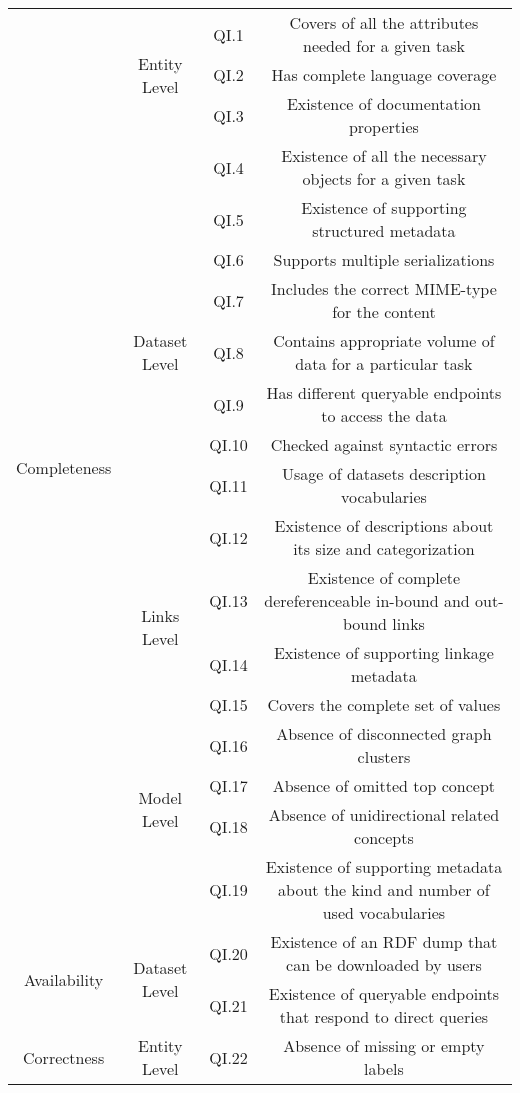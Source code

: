 \documentclass[onecolumn, crcready]{iosart2c}
\begin{document}
\begin{landscape}
\begin{center}
{\begin{longtable}[h]{|c|c|c|c|}
\multirow{19}{*}{Completeness} & \multirow{3}{*}{Entity Level} & QI.1 & Covers of all the attributes needed for a given task \cite{Mendes2012}\tabularnewline
\cline{3-4}
 &  & QI.2 & Has complete language coverage \cite{Mader2012}\tabularnewline
\cline{3-4}
 &  & QI.3 & Existence of documentation properties  \cite{w3c_skos_rec}\cite{Mader2012}\tabularnewline
\cline{2-4}
 & \multirow{9}{*}{Dataset Level} & QI.4 & Existence of all the necessary objects for a given task \cite{Mendes2012}\tabularnewline
\cline{3-4}
 &  & QI.5 & Existence of supporting structured metadata  \cite{Hogan2010}\tabularnewline
\cline{3-4}
 &  & QI.6 & Supports multiple serializations \cite{Framework2012}\tabularnewline
\cline{3-4}
 &  & QI.7 & Includes the correct MIME-type for the content  \cite{Hogan2010}\tabularnewline
\cline{3-4}
 &  & QI.8 & Contains appropriate volume of data for a particular task \cite{Framework2012}\tabularnewline
\cline{3-4}
 &  & QI.9 & Has different queryable endpoints to access the data \cite{Framework2012}\tabularnewline
\cline{3-4}
 &  & QI.10 & Checked against syntactic errors \cite{Hogan2010}\tabularnewline
\cline{3-4}
 &  & QI.11 & Usage of datasets description vocabularies \tabularnewline
\cline{3-4}
 &  & QI.12 & Existence of descriptions about its size and categorization \tabularnewline
\cline{2-4}
 & \multirow{2}{*}{Links Level} & QI.13 & Existence of complete dereferenceable in-bound and out-bound links \cite{Hogan2010}\cite{Mader2012}\cite{Gueret2012}\tabularnewline
\cline{3-4}
 &  & QI.14 & Existence of supporting linkage metadata  \cite{Hogan2010}\tabularnewline
\cline{2-4}
 & \multirow{5}{*}{Model Level} & QI.15 & Covers the complete set of values \cite{Mader2012}\tabularnewline
\cline{3-4}
 &  & QI.16 & Absence of disconnected graph clusters \cite{Mader2012}\tabularnewline
\cline{3-4}
 &  & QI.17 & Absence of omitted top concept \cite{Hogan2010}\tabularnewline
\cline{3-4}
 &  & QI.18 & Absence of unidirectional related concepts \cite{Hogan2010}\tabularnewline
\cline{3-4}
 &  & QI.19 & Existence of supporting metadata about the kind and number of used vocabularies \cite{Framework2012}\tabularnewline
\hline
\hline
\multirow{2}{*}{Availability} & \multirow{2}{*}{Dataset Level} & QI.20 & Existence of an RDF dump that can be downloaded by users \cite{flemming2010}\cite{Hogan2010}\tabularnewline
\cline{3-4}
 &  & QI.21 & Existence of queryable endpoints that respond to direct queries\tabularnewline
\hline
\hline
\multirow{8}{*}{Correctness} & \multirow{4}{*}{Entity Level} & QI.22 & Absence of missing or empty labels \cite{Acosta2013}\cite{Mader2012}\tabularnewline

\end{longtable}}
\end{center}
\end{landscape}
\end{document}
